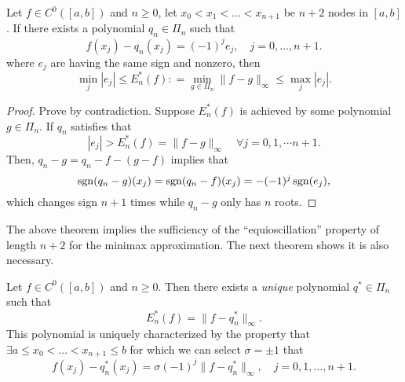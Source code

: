 \begin{theorem}
\label{Thm: 4-DE-LA-VAL-POU}
    Let $f\in C^0([a, b])$ and $n\ge 0$, let $x_0<x_1<\dots<x_{n+1}$ be $n+2$ nodes in $[a, b]$. If there exists a polynomial $q_n\in\Pi_n$ such that 
    $$f(x_j) - q_n(x_j) = (-1)^j e_j,\quad j =0,\dots, n+1.$$ 
    where $e_j$ are having the same sign and nonzero, then 
    \begin{equation}
        \min_j |e_j|\le E_n^{\ast}(f): = \min_{g\in\Pi_n} \|f - g\|_{\infty} \le \max_j |e_j|.
    \end{equation}
\end{theorem}

\begin{proof}
    Prove by contradiction. Suppose $E_n^{\ast}(f)$ is achieved by some polynomial $g\in\Pi_n$. If $q_n$ satisfies that 
    \begin{equation}
        |e_j| > E_n^{\ast}(f) = \|f - g\|_{\infty} \quad \forall j=0,1,\cdots n+1.
    \end{equation}
    Then, $q_n - g = q_n - f - (g - f)$ implies that 
    \begin{equation}
    \operatorname{sgn}(q_n - g)(x_j) = \operatorname{sgn}(q_n - f)(x_j) = -(-1)^j\operatorname{sgn}(e_j),
    \end{equation}
    which changes sign $n+1$ times while $q_n - g$ only has $n$ roots.
\end{proof}
The above theorem implies the sufficiency of the ``equioscillation'' property of length $n+2$ for the minimax approximation. The next theorem shows it is also necessary.
\begin{theorem}
\label{Thm: 4-Che-Equ}
    Let $f\in C^0([a, b])$ and $n\ge 0$. Then there exists a \emph{unique} polynomial $q^{\ast}\in\Pi_n$ such that 
    \begin{equation}
        E_{n}^{\ast}(f) = \|f - q_n^{\ast}\|_{\infty}.
    \end{equation}
    This polynomial is uniquely characterized by the property that 
    $\exists a\le x_0<\dots < x_{n+1}\le b$ 
    for which we can select $\sigma = \pm 1$ that 
    \begin{equation}\label{EQ: 4-EQUI-OSCI}
        f(x_j) - q_n^{\ast}(x_j) = \sigma (-1)^j \|f - q_n^{\ast}\|_{\infty} ,\quad j=0,1,\dots, n+1.
    \end{equation}
\end{theorem}

